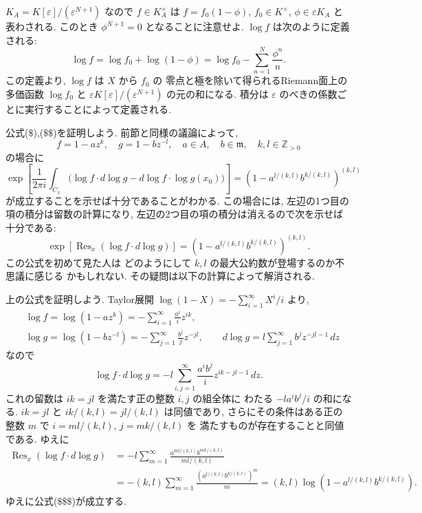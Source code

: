 \documentclass[12pt,twoside]{jarticle}
\newcommand\Z{{\mathbb Z}} %
\theoremstyle{definition} %
\theoremstyle{definition} %
\theoremstyle{definition} %
\numberwithin{theorem}{section}
\numberwithin{equation}{section}
\numberwithin{figure}{section}
\numberwithin{table}{section}
\newcommand\Res{\mathop{\mathrm{Res}}\nolimits}
\newcommand\eps{\varepsilon}
\newcommand\m{{\mathfrak m}}
\begin{document}
$K_A=K[\eps]/(\eps^{N+1})$ なので $f\in K_A^\times$ は
$f=f_0(1-\phi)$,
$f_0\in K^\times$, $\phi\in\eps K_A$ と表わされる.
このとき $\phi^{N+1}=0$ となることに注意せよ.
$\log f$ は次のように定義される:
\[
\log f
= \log f_0 + \log(1-\phi)
= \log f_0 - \sum_{n=1}^N \frac{\phi^n}{n}.
\]
この定義より, $\log f$ は $X$ から $f_0$ の
零点と極を除いて得られるRiemann面上の多価函数 $\log f_0$
と $\eps K[\eps]/(\eps^{N+1})$ の元の和になる.
積分は $\eps$ のべきの係数ごとに実行することによって定義される.

公式($\$$),($\$\$$)を証明しよう.
前節と同様の議論によって,
\[
f=1-az^k, \quad g=1-bz^{-l}, \quad a\in A,\quad b\in\m, \quad k,l\in\Z_{>0}
\]
の場合に
\[
\exp\left[
\frac{1}{2\pi i}\int_{C_x} \bigl(
  \log f\cdot d\log g - d\log f\cdot\log g(x_0)
\bigr)
\right]
=
\left( 1 - a^{l/(k,l)}b^{k/(k,l)} \right)^{(k,l)}
\]
が成立することを示せば十分であることがわかる.
この場合には,
左辺の1つ目の項の積分は留数の計算になり,
左辺の2つ目の項の積分は消えるので次を示せば十分である:
\[
\exp\left[
\Res_x(\log f\cdot d\log g)
\right]
=
\left( 1 - a^{l/(k,l)}b^{k/(k,l)} \right)^{(k,l)}.
\tag{$\$\$\$$}
\]
この公式を初めて見た人は
どのようにして $k,l$ の最大公約数が登場するのか不思議に感じる
かもしれない. その疑問は以下の計算によって解消される.

上の公式を証明しよう. Taylor展開 $\log(1-X)=-\sum_{i=1}^\infty X^i/i$ より,
\begin{align*}
&
\log f = \log(1-az^k) = - \sum_{i=1}^\infty \frac{a^i}{i} z^{ik},
\\ &
\log g = \log(1-bz^{-l}) = - \sum_{j=1}^\infty \frac{b^j}{j} z^{-jl},
\qquad
d\log g = l \sum_{j=1}^\infty b^j z^{-jl-1}\,dz
\end{align*}
なので
\[
\log f\cdot d\log g
= -l \sum_{i,j=1}^\infty \frac{a^i b^j}{i} z^{ik-jl-1}\,dz.
\]
これの留数は $ik=jl$ を満たす正の整数 $i,j$ の組全体に
わたる $-la^ib^j/i$ の和になる.
$ik=jl$ と $ik/(k,l)=jl/(k,l)$ は同値であり,
さらにその条件はある正の整数 $m$ で $i=ml/(k,l)$, $j=mk/(k,l)$ を
満たすものが存在することと同値である. ゆえに
\begin{align*}
\Res_x(\log f\cdot d\log g)
&
= -l \sum_{m=1}^\infty \frac{a^{ml/(k,l)}b^{mk/(k,l)}}{ml/(k,l)}
\\ &
= -(k,l)\sum_{m=1}^\infty
  \frac{\left( a^{l/(k,l)}b^{k/(k,l)} \right)^{m}}{m}
= (k,l)\log\left( 1 - a^{l/(k,l)}b^{k/(k,l)} \right).
\end{align*}
ゆえに公式($\$\$\$$)が成立する.

\end{document}
